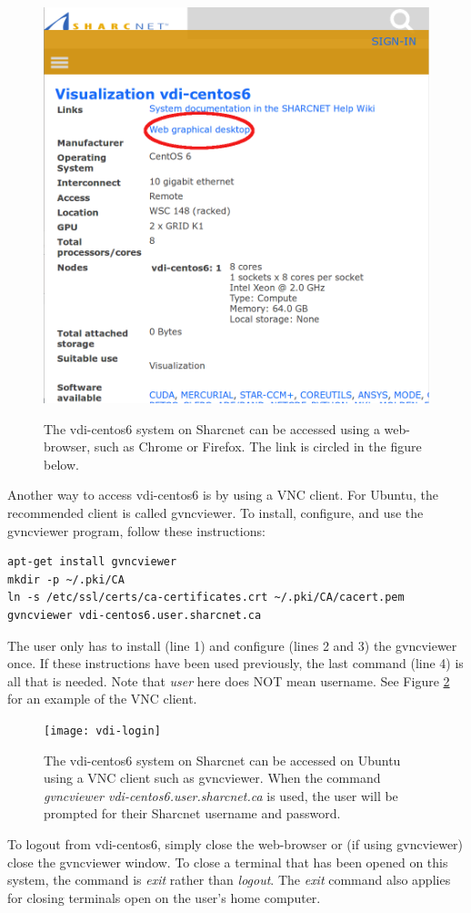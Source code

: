 \documentclass[12pt]{article}
\begin{document}
\begin{figure}[H]
\centering
\caption{The vdi-centos6 system on Sharcnet can be accessed using a web-browser, such as Chrome or Firefox. The link is circled in the figure below.}
\includegraphics[width=.7\textwidth]{vdi-link}
\label{vdi-link}
\end{figure}

\quad Another way to access vdi-centos6 is by using a VNC client. For Ubuntu, the recommended client is called gvncviewer. To install, configure, and use the gvncviewer program, follow these instructions: 
\begin{lstlisting}
apt-get install gvncviewer
mkdir -p ~/.pki/CA
ln -s /etc/ssl/certs/ca-certificates.crt ~/.pki/CA/cacert.pem
gvncviewer vdi-centos6.user.sharcnet.ca
\end{lstlisting}
The user only has to install (line 1) and configure (lines 2 and 3) the gvncviewer once. If these instructions have been used previously, the last command (line 4) is all that is needed. Note that \textit{user} here does NOT mean username. See Figure \ref{vdi-login} for an example of the VNC client.

\begin{figure}[H]
\centering
\caption{The vdi-centos6 system on Sharcnet can be accessed on Ubuntu using a VNC client such as gvncviewer. When the command \textit{gvncviewer vdi-centos6.user.sharcnet.ca} is used, the user will be prompted for their Sharcnet username and password.}
\texttt{[image: vdi-login]}
\label{vdi-login}
\end{figure}

\quad To logout from vdi-centos6, simply close the web-browser or (if using gvncviewer) close the gvncviewer window. To close a terminal that has been opened on this system, the command is \textit{exit} rather than \textit{logout}. The \textit{exit} command also applies for closing terminals open on the user's home computer.
\end{document}
